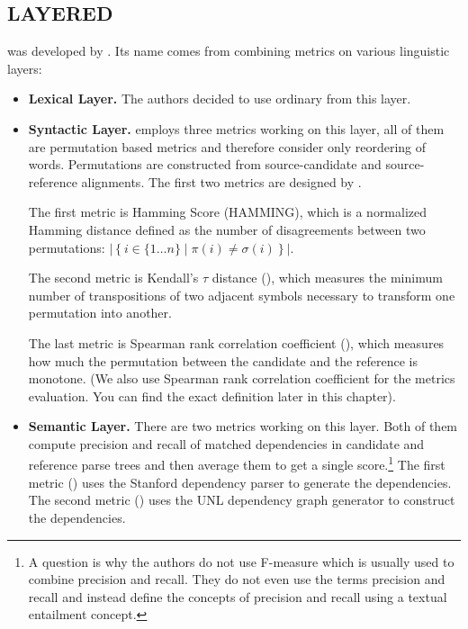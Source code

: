 \subsection{LAYERED}

 was developed by . Its name
comes from combining metrics on various linguistic layers:

\begin{itemize}

    \item \textbf{Lexical Layer.} The authors decided to use ordinary
         from this layer.

    \item \textbf{Syntactic Layer.}  employs three metrics
        working on this layer, 
        all of them are permutation based
        metrics and therefore consider only reordering of words. Permutations
        are constructed from source-candidate and source-reference alignments.
        The first two metrics are designed by .

        The first metric is Hamming Score (HAMMING), which is a normalized
        Hamming distance defined as the number of disagreements between two
        permutations: $\left| \left\{ i \in \{1 \ldots n\} \mid \pi(i) \ne
        \sigma(i) \right\} \right|$. 

        The second metric is Kendall's $\tau$ distance (), which
        measures the minimum number of transpositions of two adjacent symbols
        necessary to transform one permutation into another.
        
        The last metric
        is Spearman rank correlation coefficient (), which
        measures how much the permutation between the candidate and the
        reference is monotone. (We also use Spearman rank correlation coefficient
        for the metrics evaluation. You can find the exact definition later in
        this chapter).

    \item \textbf{Semantic Layer.} There are two metrics working on this layer.
        Both of them compute precision and recall of matched dependencies in
        candidate and reference parse trees and then average them to get a
        single score.\footnote{A question is why the authors do not use
            F-measure which is usually used to combine precision and recall.
        They do not even use the terms precision and recall and instead
    define the concepts of precision and recall using a textual entailment
concept.}  The first metric () uses the Stanford dependency
parser  to generate the dependencies. The
second metric () uses the UNL dependency graph generator to
construct the dependencies.

\end{itemize}


